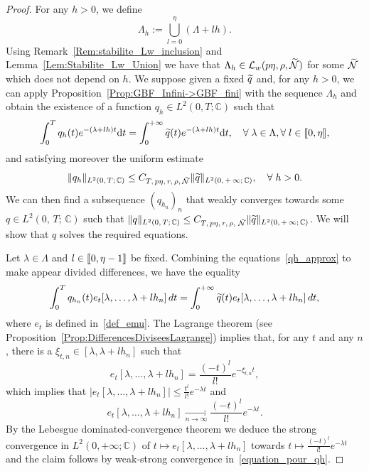 \documentclass[11pt]{article}
\theoremstyle{definition}
\numberwithin{equation}{section}
\numberwithin{figure}{section}
\numberwithin{table}{section}
\newcommand{\llbracket}{\mathopen{[\mkern -2.7mu[}}
\newcommand{\rrbracket}{\mathclose{]\mkern -2.7mu]}}
\newcommand{\inter}[2]{\llbracket #1,#2 \rrbracket}
\newcommand{\LL}{\mathcal{L}}
\newcommand{\NN}{\mathcal{N}}
\newcommand{\C}{\mathbb{C}}
\newcommand{\md}{\mathrm{d}}
\let\oldtilde\tilde
\renewcommand*{\tilde}[1]{\mathchoice{\widetilde{#1}}{\widetilde{#1}}{\oldtilde{#1}}{\oldtilde{#1}}}\let\oldexists\exists
\renewcommand*{\exists}{\mathrel{\oldexists}}
\let\oldforall\forall
\renewcommand*{\forall}{\mathrel{\oldforall}}
\begin{document}
\begin{proof}
For any $h>0$, we define
\[
\Lambda_h:=\bigcup_{l=0}^{\eta} (\Lambda + l h).
\]
Using Remark~\ref{Rem:stabilite_Lw_inclusion} and Lemma~\ref{Lem:Stabilite_Lw_Union} we have that $\Lambda_h\in \LL_w(p\eta, \rho, \tilde{\NN})$ for some $\tilde{\NN}$ which does not depend on $h$. We suppose given a fixed $\tilde{q}$ and, for any $h>0$, we can apply Proposition~\ref{Prop:GBF_Infini->GBF_fini} with the sequence $\Lambda_h$ and obtain the existence of a function $q_h\in L^2(0,T;\C)$ such that
\begin{equation}\label{qh_approx}
\int_0^T q_h(t) e^{-(\lambda + lh) t} \md t = \int_0^{+\infty} \tilde{q}(t) e^{-(\lambda + lh) t} \md t, \quad\forall \lambda\in \Lambda, \forall l\in \inter{0}{\eta},
\end{equation}
and satisfying moreover the uniform estimate
\[
\|q_h\|_{L^2(0,\,T;\,\C)} \leq C_{T,\,p\eta,\,r,\,\rho, \,\tilde{\NN}} \|\tilde{q}\|_{L^2(0,\,+\,\infty;\,\C)}, \quad \forall h>0.
\]
We can then find a subsequence $(q_{h_n})_n$ that weakly converges towards some $q\in L^2(0,\,T;\,\C)$ such that $\|q\|_{L^2(0,\,T;\,\C)} \leq C_{T,\,p\eta,\,r,\,\rho,\, \,\tilde{\NN}} \|\tilde{q}\|_{L^2(0,\,+\,\infty;\,\C)}$. We will show that $q$ solves the required equations.

Let $\lambda\in \Lambda$ and $l\in \inter{0}{\eta-1}$ be fixed. Combining the equations~\eqref{qh_approx} to make appear divided differences, we have the equality
\begin{equation}\label{equation_pour_qh}
\int_0^{T} q_{h_n}(t) e_t[\lambda,\dotsc,\lambda+lh_n] \, dt = \int_0^{+\infty} \tilde{q}(t) e_t[\lambda,\dotsc,\lambda+l h_n] \, dt,
\end{equation}
where $e_t$ is defined in~\eqref{def_emu}. The Lagrange theorem (see Proposition~\ref{Prop:DifferencesDiviseesLagrange}) implies that, for any $t$ and any $n$, there is a $\xi_{t,n}\in [\lambda,\lambda+lh_n]$ such that
\[
e_t[\lambda,\dotsc,\lambda+lh_n] = \frac{(-t)^l}{l!} e^{-\xi_{t,n} t},
\]
which implies that $| e_t[\lambda,\dotsc,\lambda+lh_n]|\leq \frac{t^l}{l!} e^{-\lambda t}$ and
\[
e_t[\lambda,\dotsc,\lambda+lh_n]\xrightarrow[n\to \infty]{} \frac{(-t)^l}{l!} e^{-\lambda t}.
\]
By the Lebesgue dominated-convergence theorem we deduce the strong convergence in $L^2(0,+\infty;\C)$ of $t\mapsto e_t[\lambda,\dotsc,\lambda+lh_n]$ towards $t\mapsto \frac{(-t)^l}{l!} e^{-\lambda t}$ and the claim follows by weak-strong convergence in~\eqref{equation_pour_qh}.
\end{proof}
\end{document}
